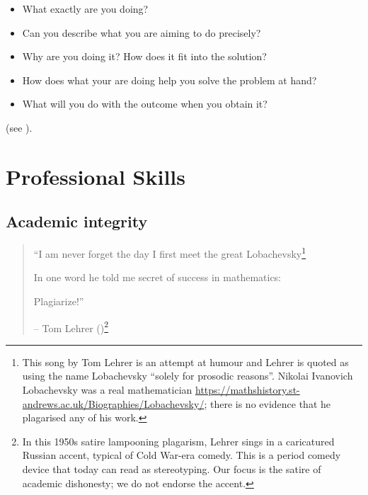 \documentclass[
  a4paper,
  DIV=11,
  numbers=noendperiod,
  oneside]{scrreprt}
\providecommand{\tightlist}{%
  \setlength{\itemsep}{0pt}\setlength{\parskip}{0pt}}
\begin{document}
\begin{tcolorbox}[enhanced jigsaw, opacitybacktitle=0.6, colframe=quarto-callout-important-color-frame, bottomrule=.15mm, coltitle=black, colback=white, title=\textcolor{quarto-callout-important-color}{\faExclamation}\hspace{0.5em}{Try answering these questions:}, breakable, toptitle=1mm, arc=.35mm, left=2mm, opacityback=0, rightrule=.15mm, bottomtitle=1mm, colbacktitle=quarto-callout-important-color!10!white, toprule=.15mm, leftrule=.75mm, titlerule=0mm]

\begin{itemize}
\tightlist
\item
  What exactly are you doing?
\item
  Can you describe what you are aiming to do precisely?
\item
  Why are you doing it? How does it fit into the solution?
\item
  How does what your are doing help you solve the problem at hand?
\item
  What will you do with the outcome when you obtain it?
\end{itemize}

(see ).

\end{tcolorbox}

\part{Professional Skills}

\chapter{Academic integrity}\label{sec-academic-integrity}

\begin{quote}
``I am never forget the day I first meet the great
Lobachevsky\footnote{This song by Tom Lehrer is an attempt at humour and
  Lehrer is quoted as using the name Lobachevsky ``solely for prosodic
  reasons''. Nikolai Ivanovich Lobachevsky was a real mathematician
  \url{https://mathshistory.st-andrews.ac.uk/Biographies/Lobachevsky/};
  there is no evidence that he plagarised any of his work.}

In one word he told me secret of success in mathematics:

Plagiarize!''

-- Tom Lehrer ()\footnote{In this 1950s satire lampooning plagarism, Lehrer sings
  in a caricatured Russian accent, typical of Cold War-era comedy. This
  is a period comedy device that today can read as stereotyping. Our
  focus is the satire of academic dishonesty; we do not endorse the
  accent.}
\end{quote}
\end{document}
